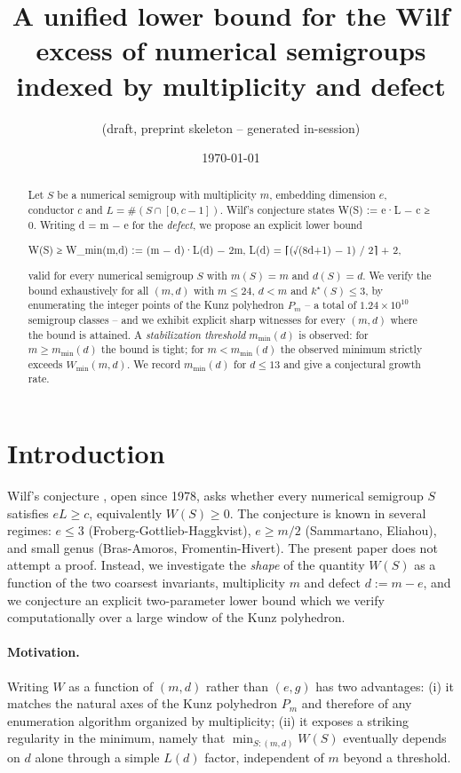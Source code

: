 \documentclass[11pt,a4paper]{article}
\title{A unified lower bound for the Wilf excess of numerical semigroups\\
       indexed by multiplicity and defect}
\author{(draft, preprint skeleton -- generated in-session)}
\date{\today}
\begin{document}
\maketitle

\begin{abstract}
Let $S$ be a numerical semigroup with multiplicity $m$, embedding dimension
$e$, conductor $c$ and $L = \#(S \cap [0,c-1])$. Wilf's conjecture states
W(S) := e·L − c ≥ 0. Writing d = m − e for the \emph{defect}, we
propose an explicit lower bound

\begin{center}
W(S) ≥ W\_min(m,d) := (m − d)·L(d) − 2m, \qquad
L(d) = ⌈(√(8d+1) − 1) / 2⌉ + 2,
\end{center}

valid for every numerical semigroup $S$ with $m(S) = m$ and $d(S) = d$.
We verify the bound exhaustively for all $(m,d)$ with $m \le 24$, $d < m$
and $k^\star(S) \le 3$, by enumerating the integer points of the Kunz
polyhedron $P_m$ -- a total of $1.24 \times 10^{10}$ semigroup classes --
and we exhibit explicit sharp witnesses for every $(m,d)$ where the bound
is attained. A \emph{stabilization threshold} $m_{\min}(d)$ is observed:
for $m \ge m_{\min}(d)$ the bound is tight; for $m < m_{\min}(d)$ the
observed minimum strictly exceeds $W_{\min}(m,d)$. We record
$m_{\min}(d)$ for $d \le 13$ and give a conjectural growth rate.
\end{abstract}

\section{Introduction}

Wilf's conjecture \cite{Wilf1978}, open since 1978, asks whether
every numerical semigroup $S$ satisfies $e L \ge c$, equivalently
$W(S) \ge 0$. The conjecture is known in several regimes: $e \le 3$
(Froberg-Gottlieb-Haggkvist), $e \ge m/2$ (Sammartano, Eliahou),
and small genus (Bras-Amoros, Fromentin-Hivert). The present paper
does not attempt a proof. Instead, we investigate the \emph{shape} of
the quantity $W(S)$ as a function of the two coarsest invariants,
multiplicity $m$ and defect $d := m - e$, and we conjecture an
explicit two-parameter lower bound which we verify computationally
over a large window of the Kunz polyhedron.

\paragraph{Motivation.}
Writing $W$ as a function of $(m,d)$ rather than $(e,g)$ has two
advantages: (i) it matches the natural axes of the Kunz polyhedron
$P_m$ and therefore of any enumeration algorithm organized by
multiplicity; (ii) it exposes a striking regularity in the minimum,
namely that $\min_{S : (m,d)} W(S)$ eventually depends on $d$ alone
through a simple $L(d)$ factor, independent of $m$ beyond a threshold.
\end{document}
